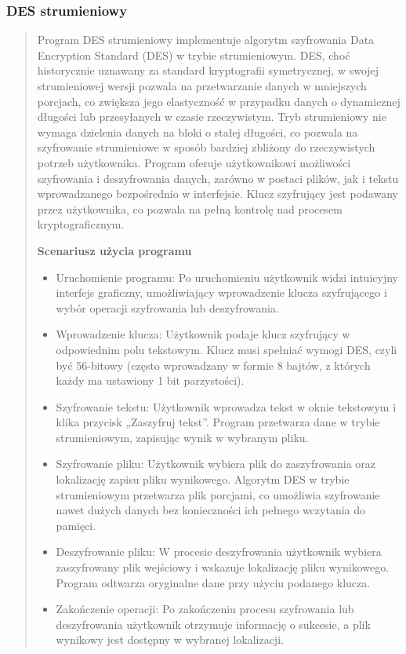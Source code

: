 \documentclass[12pt,a4paper]{article}
\begin{document}
\subsubsection{DES strumieniowy}
\begin{quotation} \noindent Program DES strumieniowy implementuje algorytm szyfrowania Data Encryption Standard (DES) w trybie strumieniowym. DES, choć historycznie uznawany za standard kryptografii symetrycznej, w swojej strumieniowej wersji pozwala na przetwarzanie danych w mniejszych porcjach, co zwiększa jego elastyczność w przypadku danych o dynamicznej długości lub przesyłanych w czasie rzeczywistym. Tryb strumieniowy nie wymaga dzielenia danych na bloki o stałej długości, co pozwala na szyfrowanie strumieniowe w sposób bardziej zbliżony do rzeczywistych potrzeb użytkownika. Program oferuje użytkownikowi możliwości szyfrowania i deszyfrowania danych, zarówno w postaci plików, jak i tekstu wprowadzanego bezpośrednio w interfejsie. Klucz szyfrujący jest podawany przez użytkownika, co pozwala na pełną kontrolę nad procesem kryptograficznym.\newline

\noindent\textbf{Scenariusz użycia programu}
\begin{itemize}
\item Uruchomienie programu: Po uruchomieniu użytkownik widzi intuicyjny interfejs graficzny, umożliwiający wprowadzenie klucza szyfrującego i wybór operacji szyfrowania lub deszyfrowania.
\item Wprowadzenie klucza: Użytkownik podaje klucz szyfrujący w odpowiednim polu tekstowym. Klucz musi spełniać wymogi DES, czyli być 56-bitowy (często wprowadzany w formie 8 bajtów, z których każdy ma ustawiony 1 bit parzystości).
\item Szyfrowanie tekstu: Użytkownik wprowadza tekst w oknie tekstowym i klika przycisk „Zaszyfruj tekst”. Program przetwarza dane w trybie strumieniowym, zapisując wynik w wybranym pliku.
\item Szyfrowanie pliku: Użytkownik wybiera plik do zaszyfrowania oraz lokalizację zapisu pliku wynikowego. Algorytm DES w trybie strumieniowym przetwarza plik porcjami, co umożliwia szyfrowanie nawet dużych danych bez konieczności ich pełnego wczytania do pamięci.
\item Deszyfrowanie pliku: W procesie deszyfrowania użytkownik wybiera zaszyfrowany plik wejściowy i wskazuje lokalizację pliku wynikowego. Program odtwarza oryginalne dane przy użyciu podanego klucza.
\item Zakończenie operacji: Po zakończeniu procesu szyfrowania lub deszyfrowania użytkownik otrzymuje informację o sukcesie, a plik wynikowy jest dostępny w wybranej lokalizacji.
\end{itemize}
\end{quotation}
\end{document}
